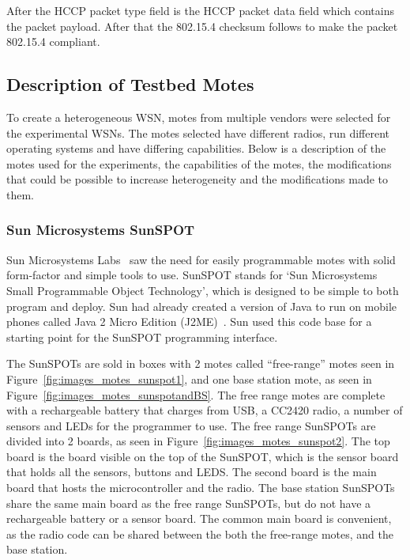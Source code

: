 After the HCCP packet type field is the HCCP packet data field which contains the 
packet payload. After that the 802.15.4 checksum follows to make the packet 802.15.4 compliant.



\subsection{Description of Testbed Motes}
\label{ch:motes}

To create a heterogeneous WSN, motes from multiple vendors 
were selected for the experimental WSNs. The motes selected 
have different radios, run different operating systems and
have differing capabilities. Below is a description of the
motes used for the experiments, the capabilities of the motes,
the modifications that could be possible to increase heterogeneity and the modifications made to them.


\subsubsection {Sun Microsystems SunSPOT}
 
	Sun Microsystems Labs~\cite{sunspot} saw the need for easily programmable
	motes with solid form-factor and simple tools to use. 
	SunSPOT stands for `Sun Microsystems Small Programmable Object Technology', which 
	is designed to be simple to both program and deploy.
	Sun had already 
	created a version of Java to run on mobile phones called Java 2 Micro Edition (J2ME)~\cite{j2me}.
	Sun used this code base for a starting point for the SunSPOT programming interface. 


	The SunSPOTs are sold in boxes with 2 motes called ``free-range'' motes seen in Figure~\ref{fig:images_motes_sunspot1}, and 
	one base station mote, as seen in Figure~\ref{fig:images_motes_sunspotandBS}. The free range motes are complete with a 
	rechargeable battery
	that charges from USB, a CC2420 radio, a number of sensors and LEDs for the programmer
	to use. The free range SunSPOTs are divided into 2 boards, as seen in Figure~\ref{fig:images_motes_sunspot2}. The top board is the board visible
	on the top of the SunSPOT, which is the sensor board that holds all the 
	sensors, buttons and LEDS. The second board is the main board that hosts the microcontroller and the radio.
	The base station SunSPOTs share the same main board as the free range SunSPOTs, but do not have
	a rechargeable battery or a sensor board. The common main board is convenient, as the radio code
	can be shared between the both the free-range motes, and the base station.
	
